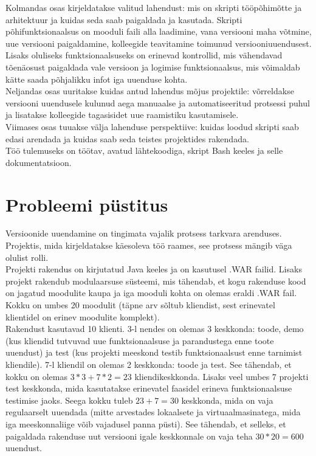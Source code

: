 \documentclass[12pt]{report}
\begin{document}
  Kolmandas osas kirjeldatakse valitud lahendust: mis on skripti tööpõhimõtte ja arhitektuur ja kuidas seda saab paigaldada ja kasutada. Skripti põhifunktsionaalsus on mooduli faili alla laadimine, vana versiooni maha võtmine, uue versiooni paigaldamine, kolleegide teavitamine toimunud versiooniuuendusest. Lisaks oluliseks funktsionaalsuseks on erinevad kontrollid, mis vähendavad tõenäosust paigaldada vale versioon ja logimise funktsionaalsus, mis võimaldab kätte saada põhjalikku infot iga uuenduse kohta.\\
  
  Neljandas osas uuritakse kuidas antud lahendus mõjus projektile: võrreldakse versiooni uuendusele kulunud aega manuaalse ja automatiseeritud protsessi puhul ja lisatakse kolleegide tagasisidet uue raamistiku kasutamisele.\\
  
  Viimases osas tuuakse välja lahenduse perspektiive: kuidas loodud skripti saab edasi arendada ja kuidas saab seda teistes projektides rakendada.\\
  
  Töö tulemuseks on töötav, avatud lähtekoodiga, skript Bash keeles ja selle dokumentatsioon.
  
  \newpage
  
  \section{Probleemi püstitus}
  
  Versioonide uuendamine on tingimata vajalik protsess tarkvara arenduses. Projektis, mida kirjeldatakse käesoleva töö raames, see protsess mängib väga olulist rolli.\\
  
  Projekti rakendus on kirjutatud Java keeles ja on kasutusel .WAR failid. Lisaks projekt rakendub modulaarsuse süsteemi, mis tähendab, et kogu rakenduse kood on jagatud moodulite kaupa ja iga mooduli kohta on olemas eraldi .WAR fail. Kokku on umbes 20 moodulit (täpne arv sõltub kliendist, sest erinevatel klientidel on erinev moodulite komplekt).\\
  
  Rakendust kasutavad 10 klienti. 3-l nendes on olemas 3 keskkonda: toode, demo (kus kliendid tutvuvad uue funktsionaalsuse ja parandustega enne toote uuendust) ja test (kus projekti meeskond testib funktsionaalsust enne tarnimist kliendile). 7-l kliendil on olemas 2 keskkonda: toode ja test. See tähendab, et kokku on olemas $3*3+7*2=23$ kliendikeskkonda. Lisaks veel umbes 7 projekti test keskkonda, mida kasutatakse erinevatel faasidel erineva funktsionaalsuse testimise jaoks. Seega kokku tuleb $23+7=30$ keskkonda, mida on vaja regulaarselt uuendada (mitte arvestades lokaalsete ja virtuaalmasinatega, mida iga meeskonnaliige võib vajadusel panna püsti). See tähendab, et selleks, et paigaldada rakenduse uut versiooni igale keskkonnale on vaja teha $30*20=600$ uuendust.\\
  
\end{document}
